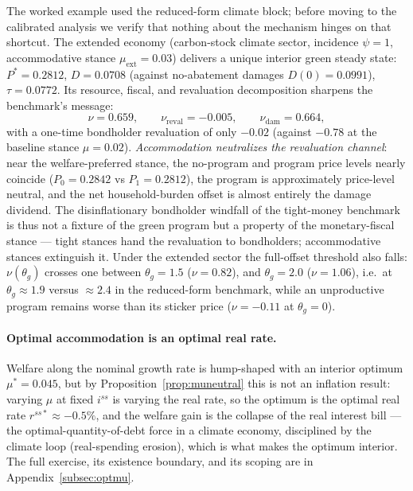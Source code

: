 \documentclass[12pt]{article}
\begin{document}
The worked example used the reduced-form climate block; before moving to
the calibrated analysis we verify that nothing about the mechanism hinges on
that shortcut. The extended economy (carbon-stock climate sector, incidence
$\psi=1$, accommodative stance $\mu_{\mathrm{ext}}=0.03$) delivers a unique interior
green steady state: $P^{*}=0.2812$, $D=0.0708$ (against no-abatement damages
$D(0)=0.0991$), $\tau=0.0772$. Its resource, fiscal, and revaluation decomposition sharpens the
benchmark's message:
\[
\nu = 0.659, \qquad \nu_{\mathrm{reval}} = -0.005, \qquad
\nu_{\mathrm{dam}} = 0.664,
\]
with a one-time bondholder revaluation of only $-0.02$ (against $-0.78$ at
the baseline stance $\mu=0.02$). \emph{Accommodation neutralizes the
revaluation channel}: near the welfare-preferred stance, the no-program and
program price levels nearly coincide ($P_0=0.2842$ vs $P_1=0.2812$), the
program is approximately price-level neutral, and the net household-burden offset is almost
entirely the damage dividend. The disinflationary bondholder windfall of the
tight-money benchmark is thus not a fixture of the green program but a property
of the monetary-fiscal stance --- tight stances hand the revaluation to
bondholders; accommodative stances extinguish it. Under the extended sector
the full-offset threshold also falls: $\nu(\theta_g)$ crosses one
between $\theta_g=1.5$ ($\nu=0.82$), and $\theta_g=2.0$ ($\nu=1.06$), i.e.\
at $\theta_g\approx1.9$ versus $\approx2.4$ in the reduced-form benchmark,
while an unproductive program remains worse than its sticker price
($\nu=-0.11$ at $\theta_g=0$).

\paragraph{Optimal accommodation is an optimal real rate.} Welfare along the
nominal growth rate is hump-shaped with an interior optimum $\mu^{*}=0.045$, but by Proposition~\ref{prop:muneutral} this is not an inflation result:
varying $\mu$ at fixed $i^{ss}$ is varying the real rate, so the
optimum is the optimal real rate $r^{ss*}\approx-0.5\%$, and the welfare gain
is the collapse of the real interest bill --- the
\citet{aiyagarimcgrattan1998} optimal-quantity-of-debt force in a climate
economy, disciplined by the climate loop (real-spending erosion), which is
what makes the optimum interior. The full exercise, its existence boundary,
and its scoping are in Appendix~\ref{subsec:optmu}.
\end{document}
